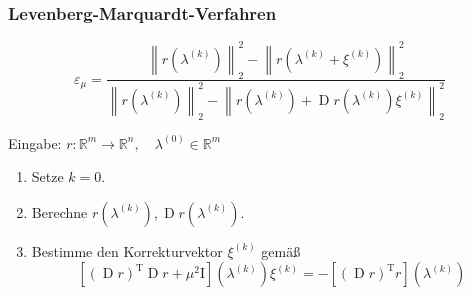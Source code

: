 \documentclass[aspectratio=169]{beamer}
\newcommand{\boxb}[1]{\left[ #1 \right]}
\newcommand{\curvb}[1]{\left( #1 \right)}
\newcommand{\norm}[1]{\left\| #1 \right\|}
\DeclareMathOperator{\Deriv}{\m{D}}
\newcommand{\SR}{\mathds{R}} %
\newcommand{\m}[1]{\mathrm{#1}}
\newcommand{\transp}[1]{{#1}^\m{T}}
\newcommand{\idmat}{\m{I}}
\begin{document}
		\begin{frame}
			\frametitle{Levenberg-Marquardt-Verfahren}

			\begin{tcolorbox}[title = relative Residualänderung]
				\[ \varepsilon_\mu = \frac{ \norm{r\curvb{\lambda^{(k)}}}^2_2 - \norm{r\curvb{\lambda^{(k)}+\xi^{(k)}}}^2_2 }{ \norm{r\curvb{\lambda^{(k)}}}^2_2 - \norm{r\curvb{\lambda^{(k)}} + \Deriv r\curvb{\lambda^{(k)}}\xi^{(k)}}^2_2 } \]
			\end{tcolorbox}
		\end{frame}

		\begin{frame}
			\begin{tcolorbox}[colframe=black,colbacktitle=white,coltitle=black, attach boxed title to top center={yshift=-2mm},enhanced, titlerule=0.1pt, boxrule=0.5pt, breakable, arc=5pt,title=Algorithmus:\quad Levenberg-Marquardt-Verfahren Teil 1]
				Eingabe: $r:\SR^m\longrightarrow\SR^n,\quad \lambda^{(0)}\in\SR^m$

				\begin{enumerate}[label=\normalfont (\arabic*)]
					\item Setze $k=0$.
					\item Berechne $r\curvb{\lambda^{(k)}}, \Deriv r\curvb{\lambda^{(k)}}$.
					\label{lm-schritt}
					\item 
					\label{lm-corr}
					Bestimme den Korrekturvektor $\xi^{(k)}$ gemäß
						\[ \boxb{ \transp{\curvb{\Deriv r}}\Deriv r + \mu^2\idmat }\curvb{\lambda^{(k)}} \xi^{(k)} = -\boxb{ \transp{\curvb{\Deriv r}}r }\curvb{\lambda^{(k)}} \]
				\end{enumerate}
			\end{tcolorbox}

		\end{frame}
\end{document}
